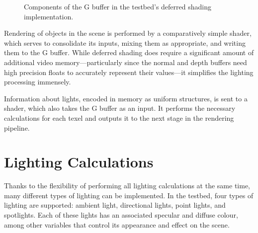 \documentclass[11pt, oneside]{report}
\begin{document}
\begin{figure}[!htbp]
  \centering
  \hfill
  \hfill
  \caption{Components of the G buffer in the testbed's deferred shading implementation.}
\end{figure}

Rendering of objects in the scene is performed by a comparatively simple \gls{shader}, which serves to consolidate its inputs, mixing them as appropriate, and writing them to the G buffer. While deferred shading does require a significant amount of additional video memory---particularly since the normal and depth buffers need high precision \glspl{float} to accurately represent their values---it simplifies the lighting processing immensely.

Information about lights, encoded in memory as uniform structures, is sent to a shader, which also takes the G buffer as an input. It performs the necessary calculations for each \gls{texel} and outputs it to the next stage in the rendering pipeline.

\section{Lighting Calculations}
Thanks to the flexibility of performing all lighting calculations at the same time, many different types of lighting can be implemented. In the testbed, four types of lighting are supported: ambient light, directional lights, point lights, and spotlights. Each of these lights has an associated \gls{specular} and \gls{diffuse} colour, among other variables that control its appearance and effect on the scene.
\end{document}

